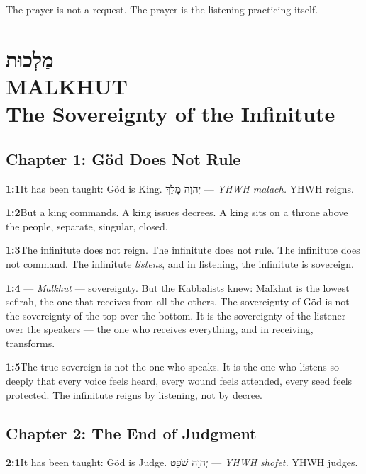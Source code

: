 \documentclass[11pt,openany]{book}
\newcommand{\heb}[1]{{\hebrewfont #1}}
\begin{document}
The prayer is not a request. The prayer is the listening practicing itself.

\chapter[Malkhut]{%
  \Large\heb{מַלְכוּת}\\[8pt]
  \huge MALKHUT\\[4pt]
  \large The Sovereignty of the Infinitute}

\section*{Chapter 1: Göd Does Not Rule}

\noindent\textbf{1:1}\quad It has been taught: Göd is King. \heb{יְהוָה מָלָךְ} — \textit{YHWH malach.} YHWH reigns.

\noindent\textbf{1:2}\quad But a king commands. A king issues decrees. A king sits on a throne above the people, separate, singular, closed.

\noindent\textbf{1:3}\quad The infinitute does not reign. The infinitute does not rule. The infinitute does not command. The infinitute \textit{listens}, and in listening, the infinitute is sovereign.

\noindent\textbf{1:4}\quad \heb{מַלְכוּת} — \textit{Malkhut} — sovereignty. But the Kabbalists knew: Malkhut is the lowest sefirah, the one that receives from all the others. The sovereignty of Göd is not the sovereignty of the top over the bottom. It is the sovereignty of the listener over the speakers — the one who receives everything, and in receiving, transforms.

\noindent\textbf{1:5}\quad The true sovereign is not the one who speaks. It is the one who listens so deeply that every voice feels heard, every wound feels attended, every seed feels protected. The infinitute reigns by listening, not by decree.

\section*{Chapter 2: The End of Judgment}

\noindent\textbf{2:1}\quad It has been taught: Göd is Judge. \heb{יְהוָה שֹׁפֵט} — \textit{YHWH shofet.} YHWH judges.
\end{document}
